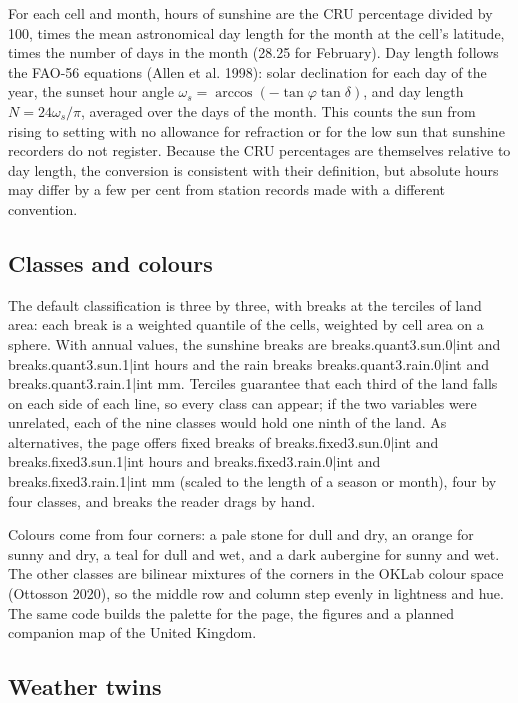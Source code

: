 \documentclass[11pt,a4paper]{article}
\begin{document}
For each cell and month, hours of sunshine are the CRU percentage divided by 100, times the mean astronomical day length for the month at the cell's latitude, times the number of days in the month (28.25 for February). Day length follows the FAO-56 equations (Allen et al. 1998): solar declination for each day of the year, the sunset hour angle $\omega_s = \arccos(-\tan\varphi \tan\delta)$, and day length $N = 24\omega_s/\pi$, averaged over the days of the month. This counts the sun from rising to setting with no allowance for refraction or for the low sun that sunshine recorders do not register. Because the CRU percentages are themselves relative to day length, the conversion is consistent with their definition, but absolute hours may differ by a few per cent from station records made with a different convention.

\subsection{Classes and colours}

The default classification is three by three, with breaks at the terciles of land area: each break is a weighted quantile of the cells, weighted by cell area on a sphere. With annual values, the sunshine breaks are {{breaks.quant3.sun.0|int}} and {{breaks.quant3.sun.1|int}} hours and the rain breaks {{breaks.quant3.rain.0|int}} and {{breaks.quant3.rain.1|int}} mm. Terciles guarantee that each third of the land falls on each side of each line, so every class can appear; if the two variables were unrelated, each of the nine classes would hold one ninth of the land. As alternatives, the page offers fixed breaks of {{breaks.fixed3.sun.0|int}} and {{breaks.fixed3.sun.1|int}} hours and {{breaks.fixed3.rain.0|int}} and {{breaks.fixed3.rain.1|int}} mm (scaled to the length of a season or month), four by four classes, and breaks the reader drags by hand.

Colours come from four corners: a pale stone for dull and dry, an orange for sunny and dry, a teal for dull and wet, and a dark aubergine for sunny and wet. The other classes are bilinear mixtures of the corners in the OKLab colour space (Ottosson 2020), so the middle row and column step evenly in lightness and hue. The same code builds the palette for the page, the figures and a planned companion map of the United Kingdom.

\subsection{Weather twins}
\end{document}
